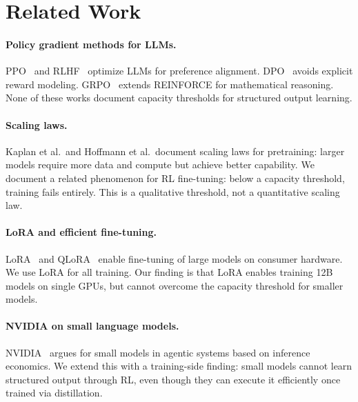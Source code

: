 \documentclass[11pt]{article}
\begin{document}
\section{Related Work}
\label{sec:related}

\paragraph{Policy gradient methods for LLMs.}
PPO~\citep{schulman2017ppo} and RLHF~\citep{ouyang2022rlhf} optimize LLMs for preference alignment.
DPO~\citep{rafailov2023dpo} avoids explicit reward modeling.
GRPO~\citep{grpo} extends REINFORCE for mathematical reasoning.
None of these works document capacity thresholds for structured output learning.

\paragraph{Scaling laws.}
Kaplan et al.\ and Hoffmann et al.\ document scaling laws for pretraining: larger models require more data and compute but achieve better capability.
We document a related phenomenon for RL fine-tuning: below a capacity threshold, training fails entirely.
This is a qualitative threshold, not a quantitative scaling law.

\paragraph{LoRA and efficient fine-tuning.}
LoRA~\citep{hu2021lora} and QLoRA~\citep{dettmers2023qlora} enable fine-tuning of large models on consumer hardware.
We use LoRA for all training.
Our finding is that LoRA enables training 12B models on single GPUs, but cannot overcome the capacity threshold for smaller models.

\paragraph{NVIDIA on small language models.}
NVIDIA~\citep{nvidia2025slm} argues for small models in agentic systems based on inference economics.
We extend this with a training-side finding: small models cannot learn structured output through RL, even though they can execute it efficiently once trained via distillation.

\end{document}
